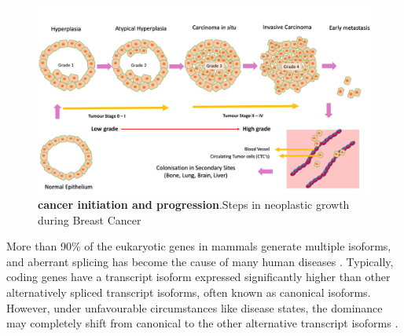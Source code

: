 \documentclass[fleqn,10pt,lineno]{wlpeerj}
\begin{document}
\begin{figure}[ht] %
\centering
\captionsetup{justification=centering}
\vspace{.5cm} %
\begin{flushright}
\includegraphics[width=150mm]{Figure5.pdf}
\caption{\textbf{cancer initiation and progression}.Steps in neoplastic growth during Breast Cancer 
\label{fig5}} %
\end{flushright}
\end{figure}
 
 More than 90\% of the eukaryotic genes in mammals generate multiple isoforms, and aberrant splicing has become the cause of many human diseases \citep{Sorek2004}. Typically, coding genes have a transcript isoform expressed significantly higher than other alternatively spliced transcript isoforms, often known as canonical isoforms. However, under unfavourable circumstances like disease states, the dominance may completely shift from canonical to the other alternative transcript isoforms \citep{Di2018}. 
 
\end{document}
